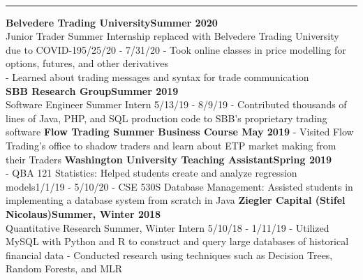 \documentclass[11pt]{article}
\begin{document}
\begin{titlepage}
\begin{addmargin}[1em]{0em}
\begin{center}
\begin{minipage}[b]{0.3\textwidth}
				\end{minipage}
			\end{center}
		\end{addmargin}
		\vspace{-10pt}
		\noindent
		\\\rule{\textwidth}{0.4pt}
		\begin{addmargin}[1em]{0em}
		    \textbf{Belvedere Trading University\hfill Summer 2020}\\
				Junior Trader Summer Internship replaced with Belvedere Trading University due to COVID-19\hfill {\small{5/25/20 - 7/31/20}}\newline
				- Took online classes in price modelling for options, futures, and other derivatives\\
				- Learned about trading messages and syntax for trade communication\\
    		\textbf{SBB Research Group\hfill Summer 2019}\\
				Software Engineer Summer Intern \hfill {\small{5/13/19 - 8/9/19}}\newline
				- Contributed thousands of lines of Java, PHP, and SQL production code to SBB's proprietary trading software\newline
            \textbf{Flow Trading Summer Business Course \hfill May 2019}\newline
				- Visited Flow Trading's office to shadow traders and learn about ETP market making from their Traders\newline
		    \textbf{Washington University Teaching Assistant\hfill Spring 2019}\\
				- QBA 121 Statistics: Helped students create and analyze regression models\hfill {\small{1/1/19 - 5/10/20}}\newline
				- CSE 530S Database Management: Assisted students in implementing a database system from scratch in Java\newline
			\textbf{Ziegler Capital (Stifel Nicolaus)\hfill Summer, Winter 2018}\\
				Quantitative Research Summer, Winter Intern \hfill {\small{5/10/18 - 1/11/19}}\newline
				- Utilized MySQL with Python and R to construct and query large databases of historical financial data \newline
				- Conducted research using techniques such as Decision Trees, Random Forests, and MLR\newline

\end{addmargin}
\end{titlepage}
\end{document}
